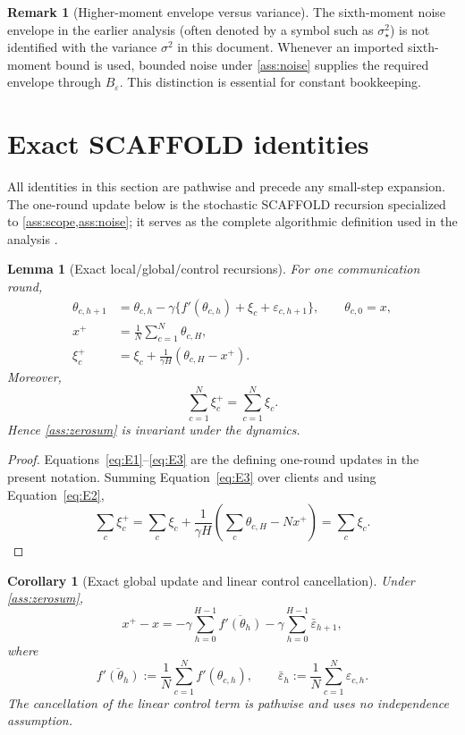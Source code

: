 \documentclass[11pt]{article}
\newtheorem{lemma}[lemma]{Lemma}
\newtheorem{corollary}[corollary]{Corollary}
\theoremstyle{definition}
\newtheorem{remark}[remark]{Remark}
\newcommand{\Scaf}{\textnormal{\textsc{SCAFFOLD}}}
\newcommand{\eps}{\varepsilon}
\begin{document}
\begin{remark}[Higher-moment envelope versus variance]
The sixth-moment noise envelope in the earlier analysis (often denoted by a symbol such as $\sigma_\star^2$) is not identified with the variance $\sigma^2$ in this document. Whenever an imported sixth-moment bound is used, bounded noise under \cref{ass:noise} supplies the required envelope through $B_\eps$. This distinction is essential for constant bookkeeping.
\end{remark}

\section{Exact SCAFFOLD identities}
\label{sec:exact}

All identities in this section are pathwise and precede any small-step expansion. The one-round update below is the stochastic \Scaf{} recursion specialized to \cref{ass:scope,ass:noise}; it serves as the complete algorithmic definition used in the analysis \citep{mangold2025scaffold}.

\begin{lemma}[Exact local/global/control recursions]
\label{lem:exact-recursion}
For one communication round,
\begin{align}
  \theta_{c,h+1}
  &=\theta_{c,h}-\gamma\{f'(\theta_{c,h})+\xi_c+\eps_{c,h+1}\},
  \qquad \theta_{c,0}=x,                                           \label{eq:E1}\\
  x^+&=\frac1N\sum_{c=1}^N\theta_{c,H},                            \label{eq:E2}\\
  \xi_c^+&=\xi_c+\frac1{\gamma H}(\theta_{c,H}-x^+).              \label{eq:E3}
\end{align}
Moreover,
\begin{equation}
\label{eq:control-sum-conservation}
  \sum_{c=1}^N\xi_c^+=\sum_{c=1}^N\xi_c.
\end{equation}
Hence \cref{ass:zerosum} is invariant under the dynamics.
\end{lemma}

\begin{proof}
Equations~\eqref{eq:E1}--\eqref{eq:E3} are the defining one-round updates in the present notation. Summing Equation~\eqref{eq:E3} over clients and using Equation~\eqref{eq:E2},
\[
  \sum_c\xi_c^+
  =\sum_c\xi_c+\frac1{\gamma H}\left(\sum_c\theta_{c,H}-Nx^+\right)
  =\sum_c\xi_c.
\]
\end{proof}

\begin{corollary}[Exact global update and linear control cancellation]
\label{cor:global-exact}
Under \cref{ass:zerosum},
\begin{equation}
\label{eq:E5}
  x^+-x
  =-\gamma\sum_{h=0}^{H-1}\overline{f'(\theta_h)}
   -\gamma\sum_{h=0}^{H-1}\bar\eps_{h+1},
\end{equation}
where
\[
  \overline{f'(\theta_h)}:=\frac1N\sum_{c=1}^N f'(\theta_{c,h}),
  \qquad
  \bar\eps_h:=\frac1N\sum_{c=1}^N\eps_{c,h}.
\]
The cancellation of the linear control term is pathwise and uses no independence assumption.
\end{corollary}
\end{document}
